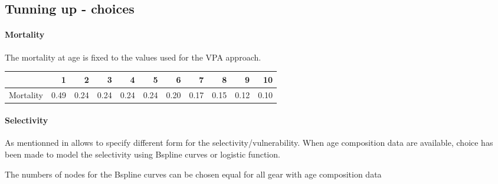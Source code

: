 
\subsection{Tunning up \iscam - choices}

\paragraph{Mortality}
The mortality at age is fixed to the values used for the VPA approach.

\begin{table}[ht]
\centering
\begin{tabular}{rrrrrrrrrrr}
  \hline
 & 1 & 2 & 3 & 4 & 5 & 6 & 7 & 8 & 9 & 10 \\ 
  \hline
Mortality & 0.49 & 0.24 & 0.24 & 0.24 & 0.24 & 0.20 & 0.17 & 0.15 & 0.12 & 0.10 \\ 
   \hline
\end{tabular}
\end{table}


\paragraph{Selectivity}
As mentionned in \iscam allows to specify different form for the
selectivity/vulnerability.  When  age composition data  are available,
choice has been made to model  the selectivity using Bspline curves or
logistic function.






The numbers  of nodes for the  Bspline curves can be  chosen equal for
all gear with age composition data 



